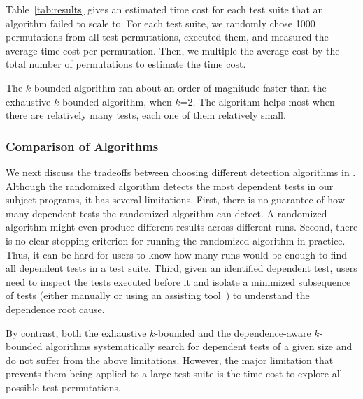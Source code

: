 Table~\ref{tab:results} gives an estimated time cost for each
test suite that an algorithm failed to scale to. For each test suite,
we randomly chose 1000 permutations from all
test permutations, executed them, and measured the average time cost
per permutation. Then, we multiple
the average cost by the total number of permutations to estimate
the time cost.

The \dependenceaware{} $k$-bounded algorithm ran about
an order of magnitude faster
than the exhaustive $k$-bounded algorithm,  when $k$=2.
The \dependenceaware{} algorithm helps most when there are relatively many
tests, each one of them relatively small.




\subsubsection{Comparison of Algorithms}
\label{sec:algcomparison}

We next discuss the tradeoffs between choosing different detection
algorithms in \ourtool. Although the randomized algorithm
detects the most dependent tests in our subject programs,
it has several limitations. First, there is no guarantee of how many
dependent tests the randomized algorithm can detect. A randomized
algorithm might even produce different results across different runs.
Second, there is no clear stopping criterion
for running the randomized algorithm in practice.
Thus, it can be hard for users
to know how many runs would be enough to find all dependent tests in a test suite.
Third, given an identified dependent test, users
need to inspect the tests executed before it and isolate a minimized
subsequence of tests (either
manually or using an assisting tool~\cite{Zeller:2002}) to understand the dependence root cause.

By contrast, both the exhaustive $k$-bounded and the depend\-ence-aware
$k$-bounded algorithms systematically search for dependent
tests of a given size and do not suffer from the above limitations.
However, the major limitation that prevents them being applied to a
large test suite is the time cost to
explore all possible test permutations.


